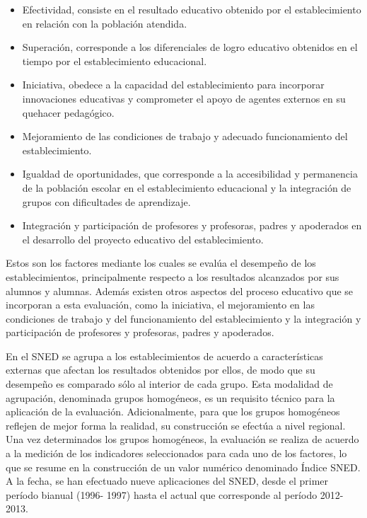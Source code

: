\begin{itemize}
    \item Efectividad, consiste en el resultado educativo obtenido por el establecimiento en relación con la población atendida.
    \item Superación, corresponde a los diferenciales de logro educativo obtenidos en el tiempo por el establecimiento educacional.
    \item Iniciativa, obedece a la capacidad del establecimiento para incorporar innovaciones educativas y comprometer el apoyo de agentes externos en su quehacer pedagógico.
    \item Mejoramiento de las condiciones de trabajo y adecuado funcionamiento del establecimiento.
    \item Igualdad de oportunidades, que corresponde a la accesibilidad y permanencia de la población escolar en el establecimiento educacional y la integración de grupos con dificultades de aprendizaje.
    \item Integración y participación de profesores y profesoras, padres y apoderados en el desarrollo del proyecto educativo del establecimiento.
\end{itemize}

Estos son los factores mediante los cuales se evalúa el desempeño de los establecimientos, principalmente respecto a los resultados alcanzados por sus alumnos y alumnas. Además existen otros aspectos del proceso educativo que se incorporan a esta evaluación, como la iniciativa, el mejoramiento en las condiciones de trabajo y del funcionamiento del establecimiento y la integración y participación de profesores y profesoras, padres y apoderados.

En el SNED se agrupa a los establecimientos de acuerdo a características externas que afectan los resultados obtenidos por ellos, de modo que su desempeño es comparado sólo al interior de cada grupo. Esta modalidad de agrupación, denominada grupos homogéneos, es un requisito técnico para la aplicación de la evaluación. Adicionalmente, para que los grupos homogéneos reflejen de mejor forma la realidad, su construcción se efectúa a nivel regional. Una vez determinados los grupos homogéneos, la evaluación se realiza de acuerdo a la medición de los indicadores seleccionados para cada uno de los factores, lo que se resume en la construcción de un valor numérico denominado Índice SNED.
A la fecha, se han efectuado nueve aplicaciones del SNED, desde el primer período bianual (1996- 1997) hasta el actual que corresponde al período 2012-2013. \cite{sned}

